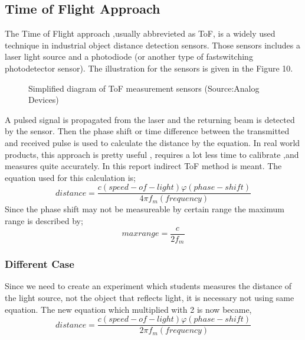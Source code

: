 \documentclass[letterpaper,12pt]{article}
\begin{document}
\subsection{Time of Flight Approach}
The Time of Flight approach ,usually abbrevieted as ToF, is a widely used technique in industrial object distance detection sensors. Those sensors includes a laser light source and a photodiode (or another type of fastswitching photodetector sensor). The illustration for the sensors is given in the Figure 10.
\begin{figure}[H] 
	\caption{Simplified diagram of ToF measurement sensors (Source:Analog Devices)}
\end{figure}
A pulsed signal is propagated from the laser and the returning beam is detected by the sensor. Then the phase shift or time difference  between the transmitted and received pulse is used to calculate the distance by the equation.
In real world products, this approach is pretty useful , requires a lot less time to calibrate ,and measures quite accurately. In this report indirect ToF method is meant. The equation used for this calculation is; 
\[distance = \frac{  c(speed-of-light)  \varphi (phase-shift)  }{4 \pi f_m (frequency)}\]
Since the phase shift may not be measureable by certain range the maximum range is described by;
\[maxrange = \frac{c}{2 f_m}\]
\subsubsection{Different Case}
Since we need to create an experiment which students measures the distance of the light source, not the object that reflects light, it is necessary not using same equation. The new equation which multiplied with 2 is now became,
\[distance = \frac{  c(speed-of-light)  \varphi (phase-shift)  }{2 \pi f_m (frequency)}\]
\end{document}
